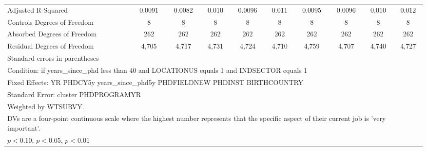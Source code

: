 \begin{table}[htbp]
\begin{tabular}{l*{9}{c}}
Adjusted R-Squared&      0.0091         &      0.0082         &       0.010         &      0.0096         &       0.011         &      0.0095         &      0.0096         &       0.010         &       0.012         \\
Controls Degrees of Freedom&           8         &           8         &           8         &           8         &           8         &           8         &           8         &           8         &           8         \\
Absorbed Degrees of Freedom&         262         &         262         &         262         &         262         &         262         &         262         &         262         &         262         &         262         \\
Residual Degrees of Freedom&       4,705         &       4,717         &       4,731         &       4,724         &       4,710         &       4,759         &       4,707         &       4,740         &       4,727         \\
\hline\hline
\multicolumn{10}{l}{\footnotesize Standard errors in parentheses}\\
\multicolumn{10}{l}{\footnotesize Condition: if years\_since\_phd less than 40 and LOCATIONUS equals 1 and INDSECTOR equals 1}\\
\multicolumn{10}{l}{\footnotesize Fixed Effects: YR PHDCY5y years\_since\_phd5y PHDFIELDNEW PHDINST BIRTHCOUNTRY}\\
\multicolumn{10}{l}{\footnotesize Standard Error: cluster PHDPROGRAMYR}\\
\multicolumn{10}{l}{\footnotesize Weighted by WTSURVY.}\\
\multicolumn{10}{l}{\footnotesize DVs are a four-point continuous scale where the highest number represents that the specific aspect of their current job is 'very important'.}\\
\multicolumn{10}{l}{\footnotesize \sym{*} \(p<0.10\), \sym{**} \(p<0.05\), \sym{***} \(p<0.01\)}\\
\end{tabular}
\end{table}
